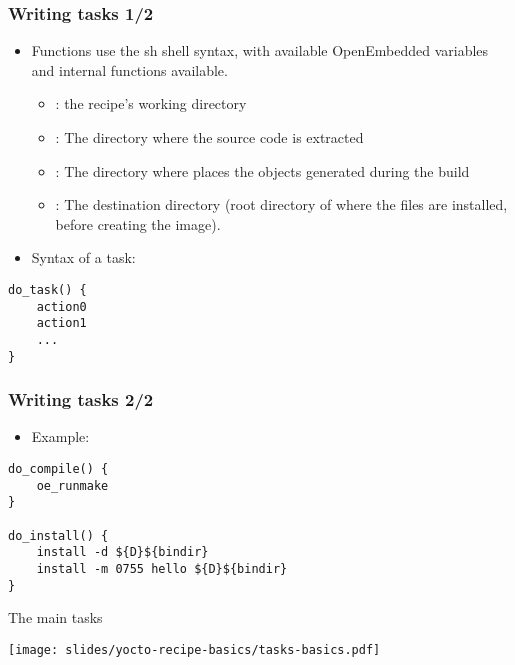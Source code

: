 \begin{frame}[fragile]
  \frametitle{Writing tasks 1/2}
  \begin{itemize}
    \item Functions use the sh shell syntax, with available
      OpenEmbedded variables and internal functions available.
      \begin{itemize}
        \item {}: the recipe's working directory
        \item {}: The directory where the source code is extracted
        \item {}: The directory where  places the objects
          generated during the build
        \item {}: The destination directory (root directory of where
          the files are installed, before creating the image).
      \end{itemize}
    \item Syntax of a task:
  \end{itemize}
  \begin{block}{}
    \begin{verbatim}
do_task() {
    action0
    action1
    ...
}
    \end{verbatim}
  \end{block}
\end{frame}

\begin{frame}[fragile]
  \frametitle{Writing tasks 2/2}
  \begin{itemize}
    \item Example:
  \end{itemize}
  \begin{block}{}
    \begin{verbatim}
do_compile() {
    oe_runmake
}

do_install() {
    install -d ${D}${bindir}
    install -m 0755 hello ${D}${bindir}
}
    \end{verbatim}
  \end{block}
\end{frame}

\begin{frame}{The main tasks}
  \begin{center}
    \texttt{[image: slides/yocto-recipe-basics/tasks-basics.pdf]}
  \end{center}
\end{frame}

